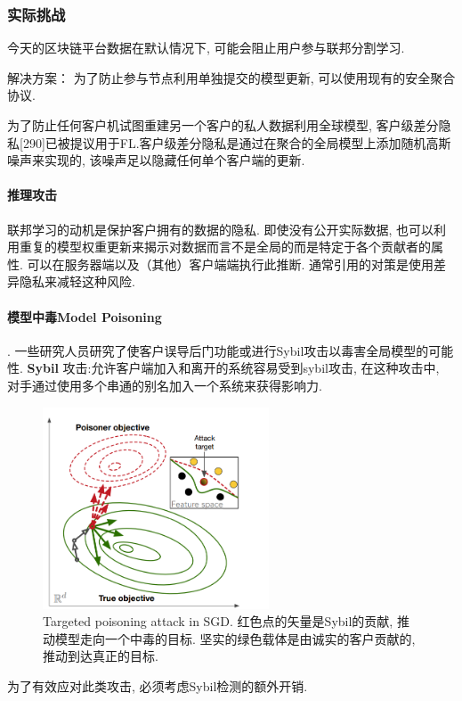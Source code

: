 \documentclass[a4paper]{article}
\theoremstyle{definition}
\numberwithin{equation}{section}
\begin{document}
\paragraph{}
 
    \subsubsection{实际挑战}

今天的区块链平台数据在默认情况下, 可能会阻止用户参与联邦分割学习.

解决方案：
为了防止参与节点利用单独提交的模型更新, 可以使用现有的安全聚合协议.

为了防止任何客户机试图重建另一个客户的私人数据利用全球模型, 客户级差分隐私[290]已被提议用于FL.客户级差分隐私是通过在聚合的全局模型上添加随机高斯噪声来实现的, 该噪声足以隐藏任何单个客户端的更新.

\paragraph{推理攻击} 联邦学习的动机是保护客户拥有的数据的隐私. 即使没有公开实际数据, 也可以利用重复的模型权重更新来揭示对数据而言不是全局的而是特定于各个贡献者的属性. 可以在服务器端以及（其他）客户端端执行此推断. 通常引用的对策是使用差异隐私来减轻这种风险. 

\paragraph{模型中毒Model Poisoning}. 一些研究人员研究了使客户误导后门功能或进行Sybil攻击以毒害全局模型的可能性. 
 \textbf{Sybil} 攻击:允许客户端加入和离开的系统容易受到sybil攻击, 在这种攻击中, 对手通过使用多个串通的别名加入一个系统来获得影响力. 
\begin{figure}[t]
    \centering    
    \includegraphics[width=0.6\textwidth]{poisoninginSGD.png}
    \caption{Targeted poisoning attack in SGD. 红色点的矢量是Sybil的贡献, 推动模型走向一个中毒的目标. 坚实的绿色载体是由诚实的客户贡献的, 推动到达真正的目标.     }
\end{figure}
为了有效应对此类攻击, 必须考虑Sybil检测的额外开销. 
\end{document}
